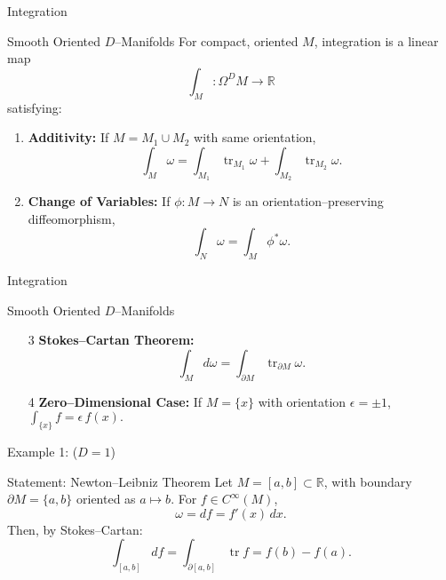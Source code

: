 \begin{frame}{Integration}
\vspace{-0.2cm}
    \begin{block}{Smooth Oriented $D$–Manifolds}
For compact, oriented $M$, integration is a linear map
\vspace{-0.3cm}
\[
\int_M:\Omega^D M\to\mathbb{R}
\]
satisfying:
\begin{enumerate}
\item \textbf{Additivity:} If \(M=M_1\cup M_2\) with same orientation,
\vspace{-0.3cm}
\[
\int_M\omega = \int_{M_1}\operatorname{tr}_{M_1}\omega + \int_{M_2}\operatorname{tr}_{M_2}\omega.
\]
\item \textbf{Change of Variables:} If \(\phi:M\to N\) is an orientation–preserving diffeomorphism,
\vspace{-0.3cm}
\[
\int_N\omega=\int_M\phi^*\omega.
\]
\end{enumerate}
\end{block}
\end{frame}

\begin{frame}{Integration}
\vspace{-0.2cm}
\begin{block}{Smooth Oriented $D$–Manifolds}
\begin{enumerate}
\item[3] \textbf{Stokes–Cartan Theorem:}
\vspace{-0.3cm}
\[
\int_M d\omega=\int_{\partial M}\operatorname{tr}_{\partial M}\omega.
\]
\item[4] \textbf{Zero–Dimensional Case:}
If \(M=\{x\}\) with orientation \(\epsilon=\pm1\),
\(\displaystyle \int_{\{x\}}f=\epsilon\,f(x).\)
\end{enumerate}
\end{block}
\end{frame}


\begin{frame}{Example 1: (\(D=1\))}
\begin{block}{Statement: Newton–Leibniz Theorem}
Let \(M=[a,b]\subset\mathbb{R}\), with boundary
\(\partial M=\{a,b\}\) oriented as \(a\mapsto b\).
For \(f\in C^\infty(M)\),
\[
\omega=df=f'(x)\,dx.
\]
Then, by Stokes–Cartan:
\[
\int_{[a,b]}df
=\int_{\partial[a,b]}\operatorname{tr}f
=f(b)-f(a).
\]
\end{block}
\vspace{-0.3cm}
\begin{center}
\end{center}
\end{frame}


